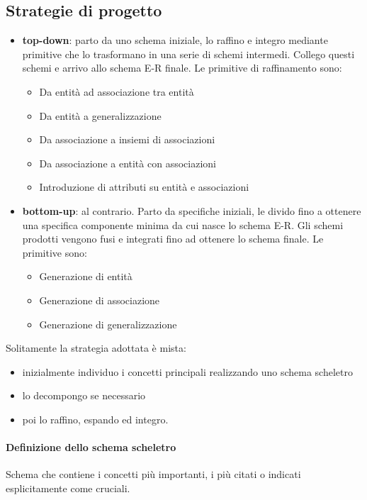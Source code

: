 \subsection{Strategie di progetto}
\begin{itemize}
	\item \textbf{top-down}: parto da uno schema iniziale, lo raffino e integro mediante primitive che lo trasformano in una serie di schemi intermedi. Collego questi schemi e arrivo allo schema E-R finale. Le primitive di raffinamento sono:
	\begin{itemize}
		\item Da entità ad associazione tra entità
		\item Da entità a generalizzazione
		\item Da associazione a insiemi di associazioni
		\item Da associazione a entità con associazioni
		\item Introduzione di attributi su entità e associazioni
	\end{itemize}
	\item \textbf{bottom-up}: al contrario. Parto da specifiche iniziali, le divido fino a ottenere una specifica componente minima da cui nasce lo schema E-R. Gli schemi prodotti vengono fusi e integrati fino ad ottenere lo schema finale. Le primitive sono:
	\begin{itemize}
		\item Generazione di entità
		\item Generazione di associazione
		\item Generazione di generalizzazione
	\end{itemize}
\end{itemize}
Solitamente la strategia adottata è mista:
\begin{itemize}
	\item inizialmente individuo i concetti principali realizzando uno schema scheletro
	\item lo decompongo se necessario
	\item poi lo raffino, espando ed integro.
\end{itemize}
\paragraph{Definizione dello schema scheletro} Schema che contiene i concetti più importanti, i più citati o indicati esplicitamente come cruciali.
